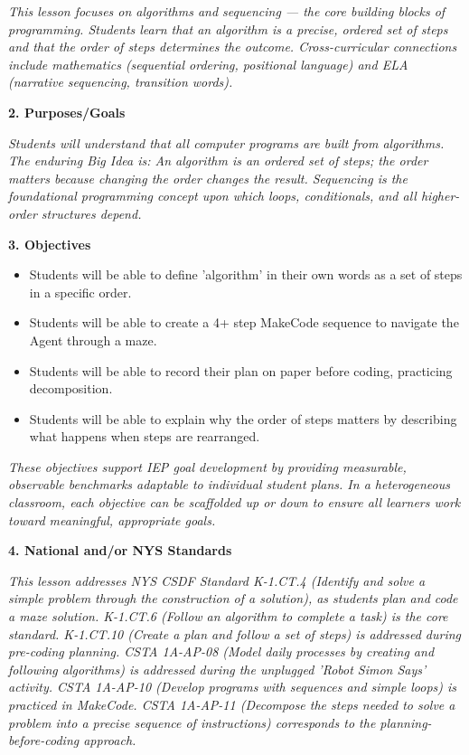 \documentclass[11pt,letterpaper]{article}
\begin{document}
\textit{This lesson focuses on algorithms and sequencing --- the core building blocks of programming. Students learn that an algorithm is a precise, ordered set of steps and that the order of steps determines the outcome. Cross-curricular connections include mathematics (sequential ordering, positional language) and ELA (narrative sequencing, transition words).}

\textbf{2. Purposes/Goals}

\textit{Students will understand that all computer programs are built from algorithms. The enduring Big Idea is: An algorithm is an ordered set of steps; the order matters because changing the order changes the result. Sequencing is the foundational programming concept upon which loops, conditionals, and all higher-order structures depend.}

\textbf{3. Objectives}

\begin{itemize}
  \item Students will be able to define 'algorithm' in their own words as a set of steps in a specific order.

  \item Students will be able to create a 4+ step MakeCode sequence to navigate the Agent through a maze.

  \item Students will be able to record their plan on paper before coding, practicing decomposition.

  \item Students will be able to explain why the order of steps matters by describing what happens when steps are rearranged.
\end{itemize}

\textit{These objectives support IEP goal development by providing measurable, observable benchmarks adaptable to individual student plans. In a heterogeneous classroom, each objective can be scaffolded up or down to ensure all learners work toward meaningful, appropriate goals.}

\textbf{4. National and/or NYS Standards}

\textit{This lesson addresses NYS CSDF Standard K-1.CT.4 (Identify and solve a simple problem through the construction of a solution), as students plan and code a maze solution. K-1.CT.6 (Follow an algorithm to complete a task) is the core standard. K-1.CT.10 (Create a plan and follow a set of steps) is addressed during pre-coding planning. CSTA 1A-AP-08 (Model daily processes by creating and following algorithms) is addressed during the unplugged 'Robot Simon Says' activity. CSTA 1A-AP-10 (Develop programs with sequences and simple loops) is practiced in MakeCode. CSTA 1A-AP-11 (Decompose the steps needed to solve a problem into a precise sequence of instructions) corresponds to the planning-before-coding approach.}
\end{document}
